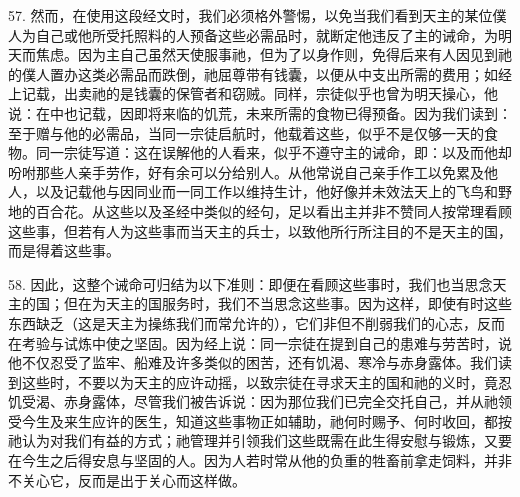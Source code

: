 57. 然而，在使用这段经文时，我们必须格外警惕，以免当我们看到天主的某位僕人为自己或他所受托照料的人预备这些必需品时，就断定他违反了主的诫命，为明天而焦虑。因为主自己虽然天使服事祂，但为了以身作则，免得后来有人因见到祂的僕人置办这类必需品而跌倒，祂屈尊带有钱囊，以便从中支出所需的费用；如经上记载，出卖祂的是钱囊的保管者和窃贼。同样，宗徒似乎也曾为明天操心，他说：在中也记载，因即将来临的饥荒，未来所需的食物已得预备。因为我们读到：至于赠与他的必需品，当同一宗徒启航时，他载着这些，似乎不是仅够一天的食物。同一宗徒写道：这在误解他的人看来，似乎不遵守主的诫命，即：以及而他却吩咐那些人亲手劳作，好有余可以分给别人。从他常说自己亲手作工以免累及他人，以及记载他与因同业而一同工作以维持生计，他好像并未效法天上的飞鸟和野地的百合花。从这些以及圣经中类似的经句，足以看出主并非不赞同人按常理看顾这些事，但若有人为这些事而当天主的兵士，以致他所行所注目的不是天主的国，而是得着这些事。\par

58. 因此，这整个诫命可归结为以下准则：即便在看顾这些事时，我们也当思念天主的国；但在为天主的国服务时，我们不当思念这些事。因为这样，即使有时这些东西缺乏（这是天主为操练我们而常允许的），它们非但不削弱我们的心志，反而在考验与试炼中使之坚固。因为经上说：同一宗徒在提到自己的患难与劳苦时，说他不仅忍受了监牢、船难及许多类似的困苦，还有饥渴、寒冷与赤身露体。我们读到这些时，不要以为天主的应许动摇，以致宗徒在寻求天主的国和祂的义时，竟忍饥受渴、赤身露体，尽管我们被告诉说：因为那位我们已完全交托自己，并从祂领受今生及来生应许的医生，知道这些事物正如辅助，祂何时赐予、何时收回，都按祂认为对我们有益的方式；祂管理并引领我们这些既需在此生得安慰与锻炼，又要在今生之后得安息与坚固的人。因为人若时常从他的负重的牲畜前拿走饲料，并非不关心它，反而是出于关心而这样做。\par

